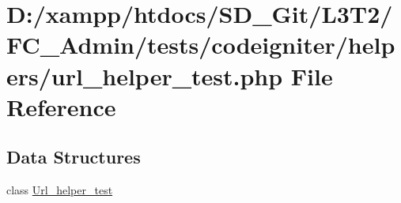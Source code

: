 \hypertarget{_admin_2tests_2codeigniter_2helpers_2url__helper__test_8php}{}\section{D\+:/xampp/htdocs/\+S\+D\+\_\+\+Git/\+L3\+T2/\+F\+C\+\_\+\+Admin/tests/codeigniter/helpers/url\+\_\+helper\+\_\+test.php File Reference}
\label{_admin_2tests_2codeigniter_2helpers_2url__helper__test_8php}
\subsection*{Data Structures}
\begin{DoxyCompactItemize}
\item 
class \hyperlink{class_url__helper__test}{Url\+\_\+helper\+\_\+test}
\end{DoxyCompactItemize}
